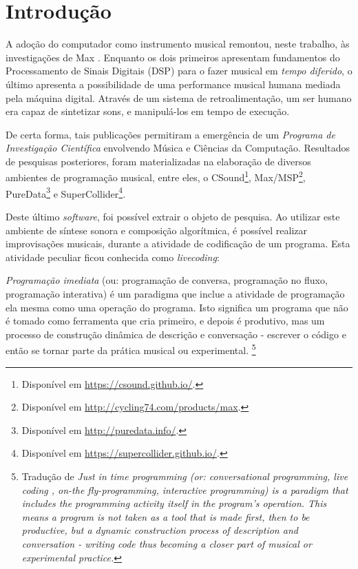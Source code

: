 \chapter*[Introdução]{Introdução}

A adoção do computador como instrumento musical remontou, neste trabalho, às investigações de Max . Enquanto os dois primeiros apresentam fundamentos do Processamento de Sinais Digitais (DSP) para o fazer musical em \emph{tempo diferido},  o último apresenta a possibilidade de uma performance musical humana mediada pela máquina digital. Através de um sistema de retroalimentação, um ser humano era capaz de sintetizar sons, e manipulá-los em tempo de execução.

De certa forma, tais publicações permitiram a emergência de um \emph{Programa de Investigação Científica} \cite{lakatos_falsification_1970,neto_lakatos_2008} envolvendo Música e Ciências da Computação. Resultados de pesquisas posteriores, foram materializadas na elaboração de diversos ambientes de programação musical, entre eles, o CSound\footnote{Disponível em \url{https://csound.github.io/}.}, Max/MSP\footnote{Disponível em \url{http://cycling74.com/products/max}.}, PureData\footnote{Disponível em \url{http://puredata.info/}.} e SuperCollider\footnote{Disponível em \url{https://supercollider.github.io/}.}.

Deste último \emph{software}, foi possível extrair o objeto de pesquisa. Ao utilizar este ambiente de síntese sonora e composição algorítmica, é possível realizar improvisações musicais, durante a atividade de codificação de um programa. Esta atividade peculiar ficou conhecida como \emph{livecoding}:

\begin{citacao}
\emph{Programação imediata} (ou: programação de conversa, programação no fluxo, programação interativa) é um paradigma que inclue a atividade de programação ela mesma como uma operação do programa. Isto significa um programa que não é tomado como ferramenta que cria primeiro, e depois é produtivo, mas um processo de construção dinâmica de descrição e conversação - escrever o código e então se tornar parte da prática musical ou experimental. \cite[Verbete JITLib]{supercollider.org_supercollider_2014}\footnote{Tradução de \emph{Just in time programming (or: conversational programming, live coding , on-the fly-programming, interactive programming) is a paradigm that includes the programming activity itself in the program's operation. This means a program is not taken as a tool that is made first, then to be productive, but a dynamic construction process of description and conversation - writing code thus becoming a closer part of musical or experimental practice.}}
\end{citacao}


